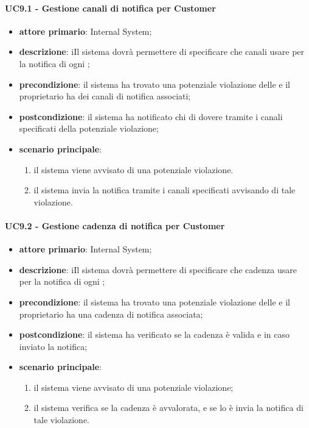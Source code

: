 \paragraph{UC9.1 -  Gestione canali di notifica per Customer}
\begin{itemize}
	\item \textbf{attore primario}: Internal System;
	\item \textbf{descrizione}: iIl sistema dovrà permettere di specificare che canali usare per la notifica di ogni ; 
	\item \textbf{precondizione}: il sistema ha trovato una potenziale violazione delle  e il  proprietario ha dei canali di notifica associati;
	\item \textbf{postcondizione}: il sistema ha notificato chi di dovere tramite i canali specificati della potenziale violazione;
	\item \textbf{scenario principale}: 
	\begin{enumerate}
		\item il sistema viene avvisato di una potenziale violazione.
		\item il sistema invia la notifica tramite i canali specificati avvisando di tale violazione.
	\end{enumerate}
\end{itemize}
\paragraph{UC9.2 -  Gestione cadenza di notifica per Customer}
\begin{itemize}
	\item \textbf{attore primario}: Internal System;
	\item \textbf{descrizione}: iIl sistema dovrà permettere di specificare che cadenza usare per la notifica di ogni ; 
	\item \textbf{precondizione}: il sistema ha trovato una potenziale violazione delle  e il  proprietario ha una cadenza di notifica associata;
	\item \textbf{postcondizione}: il sistema ha verificato se la cadenza è valida e in caso inviato la notifica;
	\item \textbf{scenario principale}: 
	\begin{enumerate}
		\item il sistema viene avvisato di una potenziale violazione;
		\item il sistema verifica se la cadenza è avvalorata, e se lo è invia la notifica di tale violazione.
	\end{enumerate}
\end{itemize}
